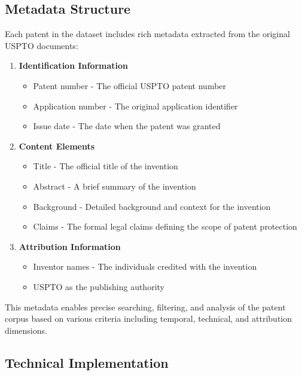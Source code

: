 \subsection{Metadata Structure}

Each patent in the dataset includes rich metadata extracted from the original USPTO documents:

\begin{enumerate}
    \item \textbf{Identification Information}
    \begin{itemize}
        \item Patent number - The official USPTO patent number
        \item Application number - The original application identifier
        \item Issue date - The date when the patent was granted
    \end{itemize}
    
    \item \textbf{Content Elements}
    \begin{itemize}
        \item Title - The official title of the invention
        \item Abstract - A brief summary of the invention
        \item Background - Detailed background and context for the invention
        \item Claims - The formal legal claims defining the scope of patent protection
    \end{itemize}
    
    \item \textbf{Attribution Information}
    \begin{itemize}
        \item Inventor names - The individuals credited with the invention
        \item USPTO as the publishing authority
    \end{itemize}
\end{enumerate}

This metadata enables precise searching, filtering, and analysis of the patent corpus based on various criteria including temporal, technical, and attribution dimensions.

\subsection{Technical Implementation}

